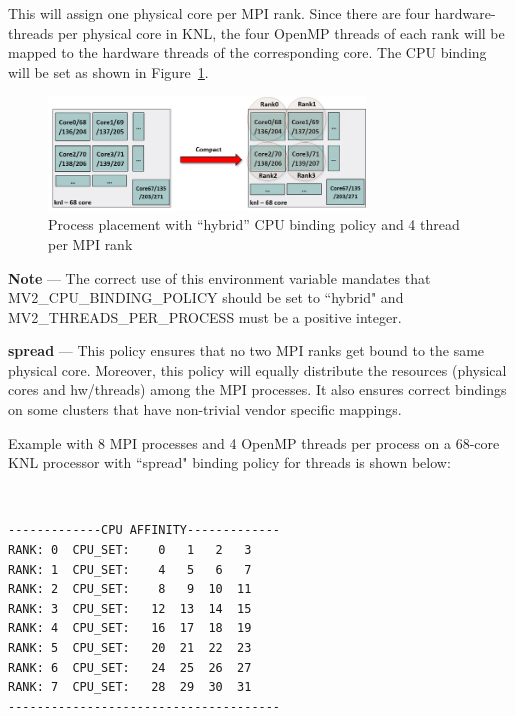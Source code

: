 This will assign one physical core per MPI rank. Since there are four
hardware-threads per physical core in KNL, the four OpenMP threads of each rank
will be mapped to the hardware threads of the corresponding core. 
The CPU binding will be set as shown in Figure~\ref{fig:compact1}.

\begin{figure}[htbp]
 \centering
 \includegraphics[width=0.75\textwidth]{Img/compact_binding.png}
 \caption{Process placement with ``hybrid'' CPU binding policy and 4 thread
          per MPI rank}
 \label{fig:compact1}
\end{figure}

\textbf{Note} --- The correct use of this environment variable mandates that \\
MV2\_CPU\_BINDING\_POLICY should be set to ``hybrid" and 
MV2\_THREADS\_PER\_PROCESS must be a positive integer. 


\textbf{spread} --- This policy ensures that no two MPI ranks get bound to 
the same physical core. Moreover, this policy will equally distribute the 
resources (physical cores and hw/threads) among the MPI processes. It also 
ensures correct bindings on some clusters that have non-trivial vendor specific mappings.

Example with 8 MPI processes and 4 OpenMP threads per process on a 68-core KNL
processor with ``spread" binding policy for threads is shown below:

\\

\begin{verbatim}
-------------CPU AFFINITY-------------
RANK: 0  CPU_SET:    0   1   2   3
RANK: 1  CPU_SET:    4   5   6   7
RANK: 2  CPU_SET:    8   9  10  11
RANK: 3  CPU_SET:   12  13  14  15
RANK: 4  CPU_SET:   16  17  18  19
RANK: 5  CPU_SET:   20  21  22  23
RANK: 6  CPU_SET:   24  25  26  27
RANK: 7  CPU_SET:   28  29  30  31
--------------------------------------
\end{verbatim}

